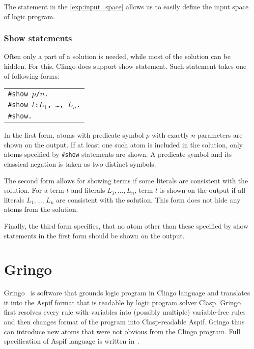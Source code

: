 The statement in the \cref{exp:input_space} allows us to easily define the input space
of logic program.

\subsubsection{Show statements}

Often only a part of a solution is needed, while most of the solution can be hidden.
For this, Clingo does support show statement. Such statement takes one of following forms:
\begin{center}
    \begin{tabular}{l}
        \texttt{\#show $p$/$n$.}\\
        \texttt{\#show $t$:$L_1$, \ldots, $L_n$.}\\
        \texttt{\#show.}
    \end{tabular}
\end{center}

In the first form, atoms with predicate symbol $p$ with exactly $n$ parameters
are shown on the output. If at least one such atom is included in the solution,
only atoms specified by \texttt{\#show} statements are shown.
A predicate symbol and its classical negation is taken as two distinct symbols.

The second form allows for showing terms if some literals are consistent with the solution.
For a term $t$ and literals $L_1, \ldots, L_n$, term $t$ is shown on the output
if all literals $L_1, \ldots, L_n$ are consistent with the solution.
This form does not hide any atoms from the solution.

Finally, the third form specifies, that no atom other than these specified by
show statements in the first form should be shown on the output.

\section{Gringo}

Gringo~\cite{GebserKKS17} is software that grounds logic program in Clingo language
and translates it into the Aspif format that is readable by logic program solver Clasp.
Gringo first resolves every rule with variables
into (possibly multiple) variable-free rules and then changes format of
the program into Clasp-readable Aspif. Gringo thus can introduce new atoms
that were not obvious from the Clingo program. Full specification of Aspif language
is written in~\cite{aspEasy2016}.

